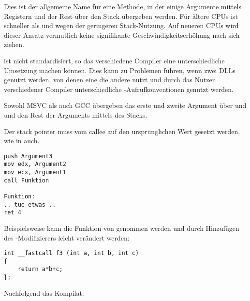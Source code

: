 Dies ist der allgemeine Name für eine Methode, in der einige Argumente mittels Registern und
der Rest über den Stack übergeben werden. Für ältere CPUs ist  schneller als
 und  wegen der geringeren Stack-Nutzung.
Auf neueren \ac{CPU}s wird dieser Ansatz vermutlich keine signifikante Geschwindigkeitserhöhung
nach sich ziehen.

 ist nicht standardisiert, so das verschiedene Compiler eine unterschiedliche
Umsetzung machen können.
Dies kann zu Problemen führen, wenn zwei DLLs genutzt werden, von denen eine die andere nutzt
und durch das Nutzen verschiedener Compiler unterschiedliche -Aufrufkonventionen
genutzt werden.

Sowohl MSVC als auch GCC übergeben das erste und zweite Argument über \ECX und \EDX und den Rest
der Arguments mittels des Stacks.

Der \gls{stack pointer} muss vom \gls{callee} auf den ursprünglichen Wert gesetzt werden,
wie in  auch.

\begin{lstlisting}[caption=fastcall]
push Argument3
mov edx, Argument2
mov ecx, Argument1
call Funktion

Funktion:
.. tue etwas ..
ret 4
\end{lstlisting}

Beispielsweise kann die Funktion von  genommen werden und durch
Hinzufügen des -Modifizierers leicht verändert werden:

\begin{lstlisting}
int __fastcall f3 (int a, int b, int c)
{
	return a*b+c;
};
\end{lstlisting}

Nachfolgend das Kompilat:

%


